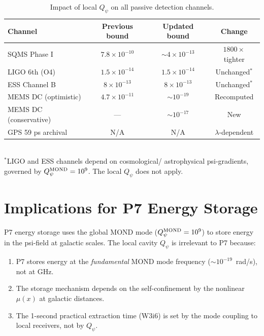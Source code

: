 \documentclass[11pt]{article}
\newcommand{\ee}[1]{\times 10^{#1}}
\theoremstyle{definition}
\theoremstyle{remark}
\begin{document}
\begin{table}[H]
\centering
\caption{Impact of local $Q_\psi$ on all passive detection channels.}
\label{tab:passive_impact}
\renewcommand{\arraystretch}{1.3}
\begin{tabular}{@{}p{3.5cm}ccc@{}}
\toprule
\textbf{Channel} & \textbf{Previous bound} & \textbf{Updated bound}
& \textbf{Change} \\
\midrule
\rowcolor{rowhi}
SQMS Phase I & $7.8\ee{-10}$ & $\sim 4\ee{-13}$ & $1800\times$ tighter \\
LIGO 6th (O4) & $1.5\ee{-14}$ & $1.5\ee{-14}$ & Unchanged$^*$ \\
ESS Channel B & $8\ee{-13}$ & $8\ee{-13}$ & Unchanged$^*$ \\
\rowcolor{rowhi}
MEMS DC (optimistic) & $4.7\ee{-11}$ & $\sim 10^{-19}$ & Recomputed \\
\rowcolor{rowmed}
MEMS DC (conservative) & --- & $\sim 10^{-17}$ & New \\
GPS 59 ps archival & N/A & N/A & $\lambda$-dependent \\
\bottomrule
\end{tabular}
\\[6pt]
\footnotesize{$^*$LIGO and ESS channels depend on cosmological/
astrophysical psi-gradients, governed by $Q_\psi^{\rm MOND} = 10^9$.
The local $Q_\psi$ does not apply.}
\end{table}


\section{Implications for P7 Energy Storage}
\label{sec:P7}

P7 energy storage uses the global MOND mode ($Q_\psi^{\rm MOND} = 10^9$)
to store energy in the psi-field at galactic scales. The local cavity
$Q_\psi$ is irrelevant to P7 because:
\begin{enumerate}[nosep]
\item P7 stores energy at the \emph{fundamental} MOND mode frequency
  ($\sim 10^{-19}$~rad/s), not at GHz.
\item The storage mechanism depends on the self-confinement by the
  nonlinear $\mu(x)$ at galactic distances.
\item The 1-second practical extraction time (W3i6) is set by the
  mode coupling to local receivers, not by $Q_\psi$.
\end{enumerate}
\end{document}
